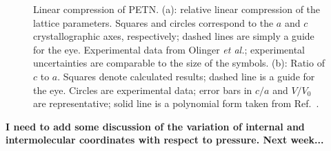 \documentclass[prb,aps,nobibnotes,twocolumn,doublespace,twocolumngrid,superbib]{revtex4}
\begin{document}
\begin{figure}
\caption{Linear compression of PETN.  (a): relative linear compression
of the lattice parameters. Squares and circles correspond to the $a$ and $c$ 
crystallographic axes, respectively; dashed lines are simply a guide for
the eye.  Experimental data from Olinger {\it et al.}\cite{Olinger_1975v62}; 
experimental uncertainties
are comparable to the size of the symbols. (b): Ratio of $c$ to $a$.
Squares denote calculated results;
dashed line is a guide for the eye.  Circles are experimental 
data\cite{Olinger_1975v62};
error bars in $c/a$ and $V/V_0$ are representative; solid line is a 
polynomial form taken from Ref.~\cite{Olinger_1975v62}.
}
\label{fig:linear_compress}
\end{figure}


{\bf I need to add some discussion of the variation of internal
and intermolecular coordinates with respect to pressure.  Next
week...}
\end{document}
